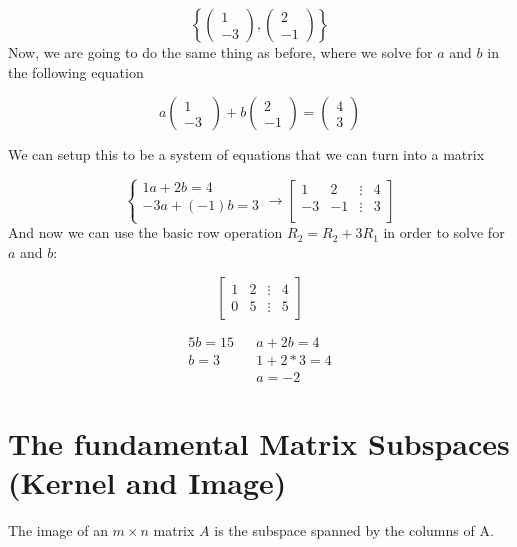 \begin{problem}
    \begin{equation}
      \left\{
        \begin{pmatrix}
          1\\-3
        \end{pmatrix}
        ,
        \begin{pmatrix}
          2\\-1
        \end{pmatrix}
      \right\}
    \end{equation}
    Now, we are going to do the same thing as before, where we solve for $a$ and $b$ in the following equation

    \begin{equation}
      a
      \begin{pmatrix}
        1\\-3\
      \end{pmatrix}
      +b
      \begin{pmatrix}
        2\\-1
      \end{pmatrix}
      =
      \begin{pmatrix}
        4\\3
      \end{pmatrix}
    \end{equation}

    We can setup this to be a system of equations that we can turn into a matrix

    \begin{equation}
      \begin{cases}
        1a+2b=4\\
        -3a+(-1)b=3\\
      \end{cases}
      \to
      \begin{bmatrix}
        1&2&\vdots&4\\
        -3&-1&\vdots&3\\
      \end{bmatrix}
    \end{equation}
    And now we can use the basic row operation $R_2=R_2+3R_1$ in order to solve for $a$ and $b$:

    \begin{equation}
      \begin{bmatrix}
        1&2&\vdots&4\\
        0&5&\vdots&5
      \end{bmatrix}
    \end{equation}

    \begin{align}
      5b=15 && a+2b=4\\
      b=3 && 1+2*3=4\\
      && a=-2
    \end{align}
  \end{problem}
  
\section{The fundamental Matrix Subspaces (Kernel and Image)}

  \begin{definition}
    The image of an $m\times n$ matrix $A$ is the subspace spanned by the columns of A.
  \end{definition}